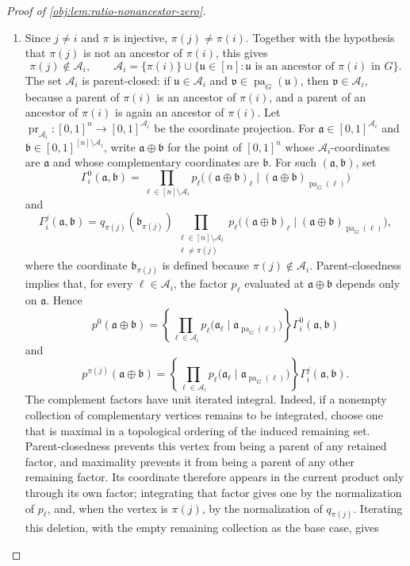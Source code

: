 \begin{proof}[Proof of \cref{obj:lem:ratio-nonancestor-zero}]
\begin{enumerate}
\item Since \(j\ne i\) and \(\pi\) is injective, \(\pi(j)\ne\pi(i)\).  Together with the hypothesis that \(\pi(j)\) is not an ancestor of \(\pi(i)\), this gives
\[
\pi(j)\notin \mathcal A_i,
\qquad
\mathcal A_i
=
\{\pi(i)\}\cup
\{\mathfrak u\in[n]:\mathfrak u\text{ is an ancestor of }\pi(i)\text{ in }G\} .
\]
The set \(\mathcal A_i\) is parent-closed: if \(\mathfrak u\in\mathcal A_i\) and \(\mathfrak v\in\operatorname{pa}_G(\mathfrak u)\), then \(\mathfrak v\in\mathcal A_i\), because a parent of \(\pi(i)\) is an ancestor of \(\pi(i)\), and a parent of an ancestor of \(\pi(i)\) is again an ancestor of \(\pi(i)\).  Let \(\operatorname{pr}_{\mathcal A_i}:[0,1]^n\to[0,1]^{\mathcal A_i}\) be the coordinate projection.  For \(\mathfrak a\in[0,1]^{\mathcal A_i}\) and \(\mathfrak b\in[0,1]^{[n]\setminus\mathcal A_i}\), write \(\mathfrak a\oplus\mathfrak b\) for the point of \([0,1]^n\) whose \(\mathcal A_i\)-coordinates are \(\mathfrak a\) and whose complementary coordinates are \(\mathfrak b\).  For such \((\mathfrak a,\mathfrak b)\), set
\[
\Gamma_i^0(\mathfrak a,\mathfrak b)
=
\prod_{\ell\in[n]\setminus\mathcal A_i}
 p_\ell\bigl((\mathfrak a\oplus\mathfrak b)_\ell\mid
 (\mathfrak a\oplus\mathfrak b)_{\operatorname{pa}_G(\ell)}\bigr)
\]
and
\[
\Gamma_i^j(\mathfrak a,\mathfrak b)
=
q_{\pi(j)}(\mathfrak b_{\pi(j)})
\prod_{\substack{\ell\in[n]\setminus\mathcal A_i\\ \ell\ne\pi(j)}}
 p_\ell\bigl((\mathfrak a\oplus\mathfrak b)_\ell\mid
 (\mathfrak a\oplus\mathfrak b)_{\operatorname{pa}_G(\ell)}\bigr),
\]
where the coordinate \(\mathfrak b_{\pi(j)}\) is defined because \(\pi(j)\notin\mathcal A_i\).  Parent-closedness implies that, for every \(\ell\in\mathcal A_i\), the factor \(p_\ell\) evaluated at \(\mathfrak a\oplus\mathfrak b\) depends only on \(\mathfrak a\).  Hence
\[
p^0(\mathfrak a\oplus\mathfrak b)
=
\left\{
\prod_{\ell\in\mathcal A_i}
 p_\ell\bigl(\mathfrak a_\ell\mid
 \mathfrak a_{\operatorname{pa}_G(\ell)}\bigr)
\right\}
\Gamma_i^0(\mathfrak a,\mathfrak b)
\]
and
\[
p^{\pi(j)}(\mathfrak a\oplus\mathfrak b)
=
\left\{
\prod_{\ell\in\mathcal A_i}
 p_\ell\bigl(\mathfrak a_\ell\mid
 \mathfrak a_{\operatorname{pa}_G(\ell)}\bigr)
\right\}
\Gamma_i^j(\mathfrak a,\mathfrak b).
\]
The complement factors have unit iterated integral.  Indeed, if a nonempty collection of complementary vertices remains to be integrated, choose one that is maximal in a topological ordering of the induced remaining set.  Parent-closedness prevents this vertex from being a parent of any retained factor, and maximality prevents it from being a parent of any other remaining factor.  Its coordinate therefore appears in the current product only through its own factor; integrating that factor gives one by the normalization of \(p_\ell\), and, when the vertex is \(\pi(j)\), by the normalization of \(q_{\pi(j)}\).  Iterating this deletion, with the empty remaining collection as the base case, gives

\end{enumerate}
\end{proof}
